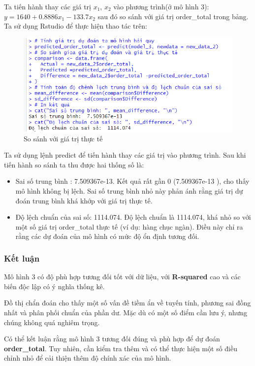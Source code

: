 Ta tiến hành thay các giá trị $x_1$, $x_2$ vào phương trình(ở mô hình 3): $y= 1640 + 0.8886x_1 - 133.7 x_2$ sau đó so sánh với giá trị order\_total trong bảng. Ta sử dụng Rstudio để thực hiện thao tác trên:

\begin{figure}[h]
  \centering
  \includegraphics[width=0.5\linewidth]{graphics/5.5.7.png}
  \caption{So sánh với giá trị thực tế }
\end{figure}

Ta sử dụng lệnh predict để tiến hành thay các giá trị vào phương trình. Sau khi tiến hành so sánh ta thu được hai thống số là:
\begin{itemize}
  \item Sai số trung bình : 7.509367e-13. Kết quả rất gần 0 (7.509367e-13 ), cho thấy mô hình không bị lệch. Sai số trung bình nhỏ này phản ánh rằng giá trị dự đoán trung bình khá khớp với giá trị thực tế.
  \item Độ lệch chuẩn của sai số: 1114.074. Độ lệch chuẩn là 1114.074, khá nhỏ so với một số giá trị order\_total thực tế (ví dụ: hàng chục ngàn). Điều này chỉ ra rằng các dự đoán của mô hình có mức độ ổn định tương đối.
\end{itemize}

\subsubsection{Kết luận}

Mô hình 3 có độ phù hợp tương đối tốt với dữ liệu, với \textbf{R-squared} cao và các biến độc lập có ý nghĩa thống kê.

Đồ thị chẩn đoán cho thấy một số vấn đề tiềm ẩn về tuyến tính, phương sai đồng nhất và phân phối chuẩn của phần dư. Mặc dù có một số điểm cần lưu ý, nhưng chúng không quá nghiêm trọng.

Có thể kết luận rằng mô hình 3 tương đối đúng và phù hợp để dự đoán \textbf{order\_total}. Tuy nhiên, cần kiểm tra thêm và có thể thực hiện một số điều chỉnh nhỏ để cải thiện thêm độ chính xác của mô hình.







